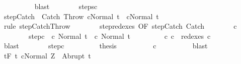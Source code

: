 \begin{isabellebody}
\ \ \ \ \ \ \ \ \isamarkupfalse%
\ blast\isanewline
\ \ \ \ \ \ \isamarkupfalse%
\ steps{\isacharunderscore}c{\isacharprime}{\isacharprime}\isanewline
\ \ \ \ \ \ \isamarkupfalse%
\ \isanewline
\ \ \ \ \ \ \isamarkupfalse%
\ step{\isacharunderscore}Catch{\isacharcolon}\ {\isachardoublequoteopen}{\isasymGamma}{\isasymturnstile}\ {\isacharparenleft}Catch\ Throw\ cNormal\ t{\isacharparenright}\ {\isasymrightarrow}\ {\isacharparenleft}cNormal\ t{\isacharparenright}{\isachardoublequoteclose}\isanewline
\ \ \ \ \ \ \ \ \isamarkupfalse%
\ {\isacharparenleft}rule\ step{\isachardot}CatchThrow{\isacharparenright}\isanewline
\ \ \ \ \ \ \isamarkupfalse%
\ step{\isacharunderscore}redexes\ {\isacharbrackleft}OF\ step{\isacharunderscore}Catch\ Catch{\isacharbrackright}\isanewline
\ \ \ \ \ \ \isamarkupfalse%
\ c{\isacharprime}{\isacharprime}{\isacharprime}\ \isanewline
\ \ \ \ \ \ \ \ step{\isacharunderscore}c{\isacharprime}{\isacharprime}{\isacharprime}{\isacharcolon}\ {\isachardoublequoteopen}{\isasymGamma}{\isasymturnstile}\ {\isacharparenleft}c{\isacharprime}{\isacharprime}{\isacharcomma}\ Normal\ t{\isacharparenright}\ {\isasymrightarrow}\ {\isacharparenleft}c{\isacharprime}{\isacharprime}{\isacharprime}{\isacharcomma}\ Normal\ t{\isacharparenright}{\isachardoublequoteclose}\ \isanewline
\ \ \ \ \ \ \ \ c{}{\isacharcolon}\ {\isachardoublequoteopen}c\ {\isasymin}\ redexes\ c{\isacharprime}{\isacharprime}{\isacharprime}{\isachardoublequoteclose}\isanewline
\ \ \ \ \ \ \ \ \isamarkupfalse%
\ blast\isanewline
\ \ \ \ \ \ \isamarkupfalse%
\ step{\isacharunderscore}c{\isacharprime}{\isacharprime}{\isacharprime}\isanewline
\ \ \ \ \ \ \isamarkupfalse%
\ \isamarkupfalse%
\ {\isacharquery}thesis\isanewline
\ \ \ \ \ \ \ \ \isamarkupfalse%
\ c{}\isanewline
\ \ \ \ \ \ \ \ \isamarkupfalse%
\ blast\isanewline
\ \ \ \ \isamarkupfalse%
\isanewline
\ \ \isamarkupfalse%
\isanewline
\ \ \isamarkupfalse%
\isanewline
\ \ \isamarkupfalse%
\ {\isachardoublequoteopen}{\isasymGamma}{\isacharcomma}{\isasymTheta}{\isasymturnstile}\isactrlsub t\isactrlbsub {\isacharslash}F\isactrlesub \ {\isacharbraceleft}t{\isachardot}\ {\isasymGamma}{\isasymturnstile}{\isasymlangle}cNormal\ Z{\isasymrangle}\ {\isasymRightarrow}\ Abrupt\ t\ {\isasymand}\ \isanewline

\end{isabellebody}

